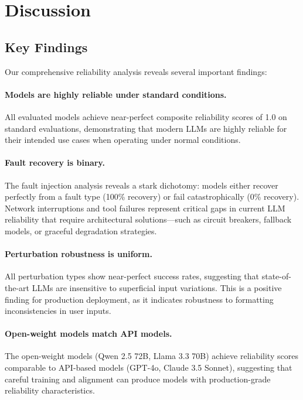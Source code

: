 \section{Discussion}

\subsection{Key Findings}

Our comprehensive reliability analysis reveals several important findings:

\paragraph{Models are highly reliable under standard conditions.} All evaluated models achieve near-perfect composite reliability scores of 1.0 on standard evaluations, demonstrating that modern LLMs are highly reliable for their intended use cases when operating under normal conditions.

\paragraph{Fault recovery is binary.} The fault injection analysis reveals a stark dichotomy: models either recover perfectly from a fault type (100\% recovery) or fail catastrophically (0\% recovery). Network interruptions and tool failures represent critical gaps in current LLM reliability that require architectural solutions---such as circuit breakers, fallback models, or graceful degradation strategies.

\paragraph{Perturbation robustness is uniform.} All perturbation types show near-perfect success rates, suggesting that state-of-the-art LLMs are insensitive to superficial input variations. This is a positive finding for production deployment, as it indicates robustness to formatting inconsistencies in user inputs.

\paragraph{Open-weight models match API models.} The open-weight models (Qwen 2.5 72B, Llama 3.3 70B) achieve reliability scores comparable to API-based models (GPT-4o, Claude 3.5 Sonnet), suggesting that careful training and alignment can produce models with production-grade reliability characteristics.


